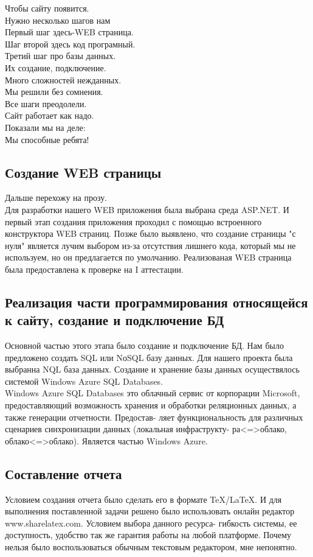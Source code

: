 \documentclass{article}
\begin{document}
Чтобы сайту появится.\\
Нужно несколько шагов нам\\
 Первый шаг здесь-WEB страница.\\
 Шаг второй здесь код програмный.\\
 Третий шаг про базы данных.\\
    Их создание, подключение.\\
    Много сложностей нежданных.\\
    Мы решили без сомнения.\\
    Все шаги преодолели.\\
    Сайт работает как надо.\\
    Показали мы на деле:\\
    Мы способные ребята!\\




 \subsection{Создание WEB страницы}
 Дальше перехожу на прозу.\\
 Для разработки нашего  WEB приложения была выбрана среда ASP.NET.
 И первый этап создания приложения проходил с помощью встроенного конструктора  WEB страниц. Позже было выявлено, что создание страницы "с нуля" является лучим выбором  из-за отсутствия лишнего кода, который мы не используем, но он предлагается по умолчанию.
 Реализованая WEB страница была предоставлена к проверке на I аттестации.

       
 \subsection{Реализация части программирования относящейся к сайту, создание и подключение БД}
Основной частью этого этапа было создание и подключение БД. Нам было предложено создать SQL или NоSQL базу данных. Для нашего проекта была выбранна NQL база данных. Создание и хранение базы данных осуществялось системой Windows Azure SQL Databases.\\
Windows Azure SQL Databases  это облачный сервис от корпорации Microsoft, предоставляющий
возможность хранения и обработки реляционных данных, а также генерации отчетности. Предостав-
ляет функциональность для различных сценариев синхронизации данных (локальная инфраструкту-
ра<=>облако, облако<=>облако). Является частью Windows Azure.

 \subsection{Составление отчета}
  Условием создания отчета было сделать его в формате TeX/LaTeX. И для выполнения поставленной задачи решено было использовать онлайн редактор www.sharelatex.com. Условием выбора данного ресурса- гибкость системы, ее доступность, удобство так же гарантия работы на любой платформе.
 Почему нельзя было воспользоваться обычным текстовым редактором, мне непонятно.
\end{document}
